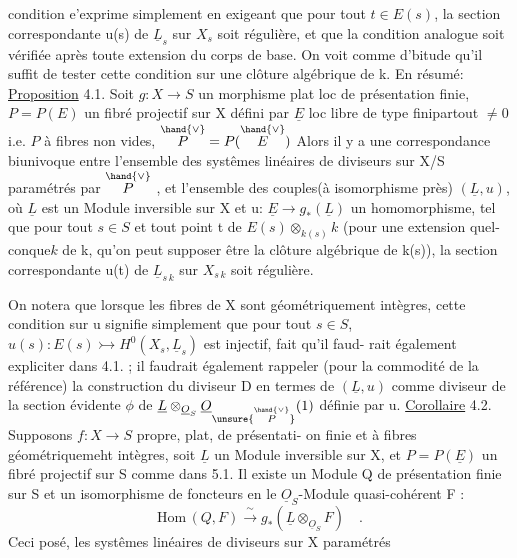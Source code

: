 
condition e'exprime simplement en exigeant que pour tout $t\in E(s)$,
la section correspondante u(s) de $\underline{L}_s$ sur $X_s$ soit régulière, et que la
condition analogue soit vérifiée après toute extension du corps de base.
On voit comme d'bitude qu'il suffit de tester cette condition sur une
clôture algébrique de k. En résumé:
\uline{Proposition} 4.1. Soit $g:X\to S$ un morphisme plat loc de présentation
finie, $P=P(E)$ un fibré projectif sur X défini par $\underline{E}$ loc libre de type
finipartout $\neq 0$ i.e. $P$ à fibres non vides, $\overset{\hand{\vee}}{P} = P(\overset{\hand{\vee}}{E})$ \hand{,} Alors il y a une correspondance biunivoque entre
l'ensemble des systêmes linéaires de diviseurs sur X/S paramétrés par $\overset{\hand{\vee}}{P}$ ,
et l'ensemble des couples(à isomorphisme près) $(\underline{L},u)$, où $\underline{L}$ est un
Module inversible sur X et u: $\underline{E}\to g_*(\underline{L})$ un homomorphisme, tel que
pour tout $s\in S$ et tout point t de $E(s)\otimes_{k(s)}k$ (pour une extension quel-%
\placedmargin{$\cdot$} conque$k$ de k, qu'on peut supposer être la clôture algébrique de k(s)),
la section correspondante u(t) de $\underline{L}_{s\,k}$ sur $X_{s\,k}$ soit régulière.

On notera que lorsque les fibres de X sont 
géométriquement intègres, cette condition sur u signifie simplement que
pour tout $s\in S$, $u(s): E(s)\rightarrowtail H^{0}(X_s,\underline{L}_s)$ est injectif, fait qu'il faud-%
rait également expliciter dans 4.1. ;  il faudrait également rappeler
(pour la commodité de la référence) la construction du diviseur D en
termes de $(\underline{L},u)$ comme diviseur de la section évidente $\phi$ de $\underline{L}\otimes_{\underline{O}_S}\underline{O}_{\unsure{\overset{\hand{\vee}}{P}}}(1)$
définie par u.
\uline{Corollaire} 4.2.  Supposons $f: X\longrightarrow S$ propre, plat, de présentati-%
on finie et à fibres géométriquemeht intègres,  soit $\underline{L}$ un Module
inversible sur X, et $P=P(\underline{E})$ un fibré projectif sur S comme dans 5.1.
 Il existe un Module Q de présentation finie sur S et un
isomorphisme de foncteurs en le $\underline{O}_S$-Module quasi-cohérent F :
\[ \mathrm{Hom}\,(Q,F) \xrightarrow{\ \sim\ } g_*(\underline{L}\otimes_{\underline{O}_S}F) \quad . \]
Ceci posé, les  systêmes linéaires de diviseurs sur X paramétrés

